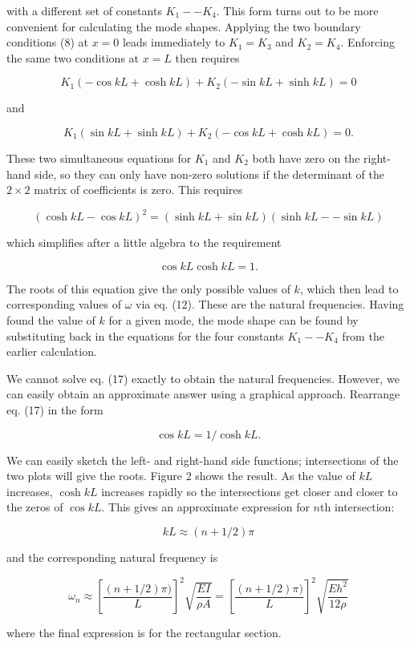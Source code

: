  with a different set of constants $K_1 -- K_4$. This form turns out to be 
  more convenient for calculating the mode shapes. Applying the two boundary 
  conditions (8) at $x=0$ leads immediately to $K_1=K_3$ and $K_2=K_4$. 
  Enforcing the same two conditions at $x=L$ then requires 

  $$K_1 (-\cos kL +\cosh kL) +K_2 (-\sin kL +\sinh kL)=0 \tag{14}$$ 

  and 

  $$K_1 (\sin kL +\sinh kL) + K_2(-\cos kL +\cosh kL)=0. \tag{15}$$ 

  These two simultaneous equations for $K_1$ and $K_2$ both have zero on the 
  right-hand side, so they can only have non-zero solutions if the determinant 
  of the $2 \times 2$ matrix of coefficients is zero. This requires 

  $$(\cosh kL -\cos kL)^2 = (\sinh kL + \sin kL)(\sinh kL -- \sin kL) 
  \tag{16}$$ 

  which simplifies after a little algebra to the requirement 

  $$\cos kL \cosh kL =1. \tag{17}$$ 

  The roots of this equation give the only possible values of $k$, which then 
  lead to corresponding values of $\omega$ via eq. (12). These are the natural 
  frequencies. Having found the value of $k$ for a given mode, the mode shape 
  can be found by substituting back in the equations for the four constants 
  $K_1 -- K_4$ from the earlier calculation. 

  We cannot solve eq. (17) exactly to obtain the natural frequencies. However, 
  we can easily obtain an approximate answer using a graphical approach. 
  Rearrange eq. (17) in the form 

  $$\cos kL =1/\cosh kL. \tag{18}$$ 

  We can easily sketch the left- and right-hand side functions; intersections 
  of the two plots will give the roots. Figure 2 shows the result. As the value 
  of $kL$ increases, $\cosh kL$ increases rapidly so the intersections get 
  closer and closer to the zeros of $\cos kL$. This gives an approximate 
  expression for $n$th intersection: 

  $$kL \approx (n +1/2) \pi \tag{19}$$ 

  and the corresponding natural frequency is 

  $$\omega_n \approx \left[ \dfrac{(n+1/2)\pi)}{L}\right]^2 
  \sqrt{\dfrac{EI}{\rho A}} = \left[ \dfrac{(n+1/2)\pi)}{L}\right]^2 
  \sqrt{\dfrac{Eh^2}{12 \rho}} \tag{20}$$ 

  where the final expression is for the rectangular section. 

